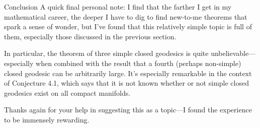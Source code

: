 \documentclass{article}
\theoremstyle{definition}
\theoremstyle{remark}
\begin{document}
\begin{section}{Conclusion}
  A quick final personal note: I find that the farther I get in my mathematical
  career, the deeper I have to dig to find new-to-me theorems that spark a
  sense of wonder, but I've found that this relatively simple topic is full
  of them, especially those discussed in the previous section.

  In particular, the theorem of three simple closed geodesics is quite
  unbelievable---especially when combined with the result that a fourth
  (perhaps non-simple) closed geodesic can be arbitrarily large. It's especially
  remarkable in the context of Conjecture 4.1, which says that it is not
  known whether or not simple closed geodesics exist on all compact manifolds.

  Thanks again for your help in suggesting this as a topic---I found the
  experience to be immensely rewarding.
\end{section}
\printbibliography
\end{document}
